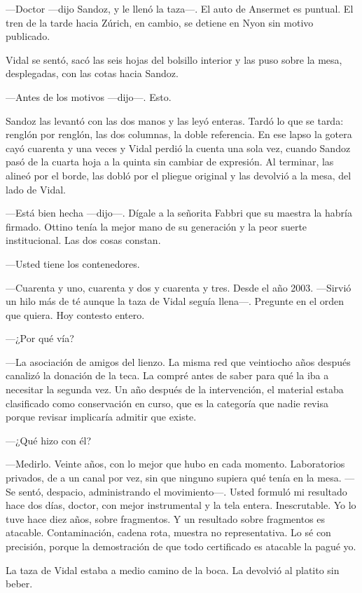 ---Doctor ---dijo Sandoz, y le llenó la taza---. El auto de Ansermet es puntual. El tren de la tarde hacia Zúrich, en cambio, se detiene en Nyon sin motivo publicado.

Vidal se sentó, sacó las seis hojas del bolsillo interior y las puso sobre la mesa, desplegadas, con las cotas hacia Sandoz.

---Antes de los motivos ---dijo---. Esto.

Sandoz las levantó con las dos manos y las leyó enteras. Tardó lo que se tarda: renglón por renglón, las dos columnas, la doble referencia. En ese lapso la gotera cayó cuarenta y una veces y Vidal perdió la cuenta una sola vez, cuando Sandoz pasó de la cuarta hoja a la quinta sin cambiar de expresión. Al terminar, las alineó por el borde, las dobló por el pliegue original y las devolvió a la mesa, del lado de Vidal.

---Está bien hecha ---dijo---. Dígale a la señorita Fabbri que su maestra la habría firmado. Ottino tenía la mejor mano de su generación y la peor suerte institucional. Las dos cosas constan.

---Usted tiene los contenedores.

---Cuarenta y uno, cuarenta y dos y cuarenta y tres. Desde el año 2003. ---Sirvió un hilo más de té aunque la taza de Vidal seguía llena---. Pregunte en el orden que quiera. Hoy contesto entero.

---¿Por qué vía?

---La asociación de amigos del lienzo. La misma red que veintiocho años después canalizó la donación de la teca. La compré antes de saber para qué la iba a necesitar la segunda vez. Un año después de la intervención, el material estaba clasificado como conservación en curso, que es la categoría que nadie revisa porque revisar implicaría admitir que existe.

---¿Qué hizo con él?

---Medirlo. Veinte años, con lo mejor que hubo en cada momento. Laboratorios privados, de a un canal por vez, sin que ninguno supiera qué tenía en la mesa. ---Se sentó, despacio, administrando el movimiento---. Usted formuló mi resultado hace dos días, doctor, con mejor instrumental y la tela entera. Inescrutable. Yo lo tuve hace diez años, sobre fragmentos. Y un resultado sobre fragmentos es atacable. Contaminación, cadena rota, muestra no representativa. Lo sé con precisión, porque la demostración de que todo certificado es atacable la pagué yo.

La taza de Vidal estaba a medio camino de la boca. La devolvió al platito sin beber.

